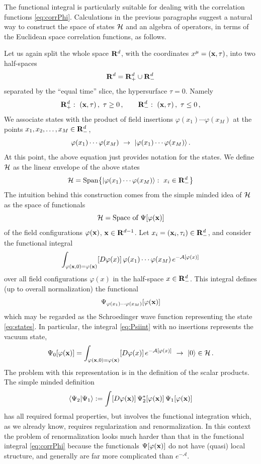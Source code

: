 The functional integral is particularly suitable for dealing with the correlation
functions \eqref{eq:corrPhi}. Calculations in the previous paragraphs suggest a
natural way to construct the space of states $\mathcal{H}$ and an algebra of operators, in
terms of the Euclidean space correlation functions, as follows.

Let us again split the whole space $\mathbf{R}^d$, with the coordinates
$x^\mu=(\mathbf{x},\tau)$, into two half-spaces
\[
\mathbf{R}^d=\mathbf{R}^d_+\cup\mathbf{R}^d_-
\]
separated by the ``equal time'' slice, the hypersurface $\tau=0$. Namely
\[
\R^d_+:\ (\xx,\tau)\,,\ \tau\ge0\,,\qquad\R^d_-:\ (\xx,\tau)\,,\ \tau\le0\,,
\]
We associate states with the product of field insertions
$\varphi(x_1)\cdots\varphi(x_M)$ at the points $x_1,x_2,\dots,x_M\in\mathbf{R}^d_-$,
\begin{equation}\label{eq:states}
\varphi(x_1)\cdots\varphi(x_M)\ \to\ \ket{\varphi(x_1)\cdots\varphi(x_M)}\,.
\end{equation}
At this point, the above equation just provides notation for the states. We define
$\mathcal{H}$ as the linear envelope of the above states
\[
\Ham=\operatorname{Span}\bigl\{\ket{\varphi(x_1)\cdots\varphi(x_M)}:\ x_i\in\R^d_-\bigr\}
\]
The intuition behind this construction comes from the simple minded idea of $\mathcal{H}$
as the space of functionals
\[
\mathcal{H}=\text{Space of }\Psi[\varphi(\mathbf{x})]
\]
of the field configurations $\varphi(\mathbf{x})$, $\mathbf{x}\in\mathbf{R}^{d-1}$. Let
$x_i=(\mathbf{x}_i,\tau_i)\in\mathbf{R}^d_-$, and consider the functional integral
\begin{equation}\label{eq:Psiint}
\int_{\varphi(\mathbf{x},0)=\varphi(\mathbf{x})}[D\varphi(x)]\,\varphi(x_1)\cdots\varphi(x_M)\,e^{-\mathcal A[\varphi(x)]}
\end{equation}
over all field configurations $\varphi(x)$ in the half-space $x\in\mathbf{R}^d_-$. This
integral defines (up to overall normalization) the functional
\[
\Psi_{\varphi(x_1)\cdots\varphi(x_M)}[\varphi(\mathbf{x})]
\]
which may be regarded as the Schroedinger wave function representing the state
\eqref{eq:states}. In particular, the integral \eqref{eq:Psiint} with no insertions
represents the vacuum state,
\[
\Psi_0[\varphi(\mathbf{x})]=\int_{\varphi(\mathbf{x},0)=\varphi(\mathbf{x})}[D\varphi(x)]\,e^{-\mathcal A[\varphi(x)]}\ \to\ |0\rangle\in\mathcal{H}\,.
\]
The problem with this representation is in the definition of the scalar products.
The simple minded definition
\begin{equation}\label{eq:naiveprod}
\langle \Psi_2|\Psi_1\rangle:=\int[D\varphi(\mathbf{x})]\,\Psi_2^*[\varphi(\mathbf{x})]\,\Psi_1[\varphi(\mathbf{x})]
\end{equation}
has all required formal properties, but involves the functional integration which,
as we already know, requires regularization and renormalization. In this context
the problem of renormalization looks much harder than that in the functional
integral \eqref{eq:corrPhi} because the functionals $\Psi[\varphi(\mathbf{x})]$ do not have
(quasi) local structure, and generally are far more complicated than
$e^{-\mathcal A}$.

